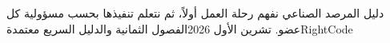 \documentclass{report}
\begin{document}
{دليل المرصد الصناعي}
{نفهم رحلة العمل أولاً، ثم نتعلم تنفيذها بحسب مسؤولية كل عضو.}
{تشرين الأول 2026}{الفصول الثمانية والدليل السريع معتمدة}{RightCode}
\tableofcontents








\end{document}
